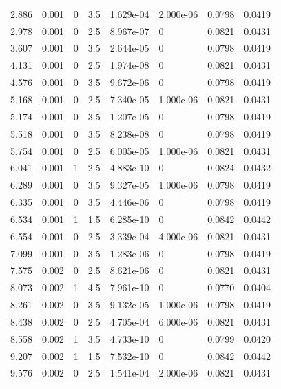 \documentclass[preview]{standalone}
\begin{document}
{{\begin{tabular}{L{1.2cm}C{1.2cm} C{0.3cm}C{0.5cm} C{1.4cm}C{1.4cm} C{1.4cm}C{1.4cm}}
  2.886  &  0.001  & 0     & 3.5 &  1.629e-04  & 2.000e-06  & 0.0798 &  0.0419   \\ 
  2.978  &  0.001  & 0     & 2.5 &  8.967e-07  & 0  & 0.0821 &  0.0431   \\ 
  3.607  &  0.001  & 0     & 3.5 &  2.644e-05  & 0  & 0.0798 &  0.0419   \\ 
  4.131  &  0.001  & 0     & 2.5 &  1.974e-08  & 0  & 0.0821 &  0.0431   \\ 
  4.576  &  0.001  & 0     & 3.5 &  9.672e-06  & 0  & 0.0798 &  0.0419   \\ 
  5.168  &  0.001  & 0     & 2.5 &  7.340e-05  & 1.000e-06  & 0.0821 &  0.0431   \\ 
  5.174  &  0.001  & 0     & 3.5 &  1.207e-05  & 0  & 0.0798 &  0.0419   \\ 
  5.518  &  0.001  & 0     & 3.5 &  8.238e-08  & 0  & 0.0798 &  0.0419   \\ 
  5.754  &  0.001  & 0     & 2.5 &  6.005e-05  & 1.000e-06  & 0.0821 &  0.0431   \\ 
  6.041  &  0.001  & 1     & 2.5 &  4.883e-10  & 0  & 0.0824 &  0.0432   \\ 
  6.289  &  0.001  & 0     & 3.5 &  9.327e-05  & 1.000e-06  & 0.0798 &  0.0419   \\ 
  6.335  &  0.001  & 0     & 3.5 &  4.446e-06  & 0  & 0.0798 &  0.0419   \\ 
  6.534  &  0.001  & 1     & 1.5 &  6.285e-10  & 0  & 0.0842 &  0.0442   \\ 
  6.554  &  0.001  & 0     & 2.5 &  3.339e-04  & 4.000e-06  & 0.0821 &  0.0431   \\ 
  7.099  &  0.001  & 0     & 3.5 &  1.283e-06  & 0  & 0.0798 &  0.0419   \\ 
  7.575  &  0.002  & 0     & 2.5 &  8.621e-06  & 0  & 0.0821 &  0.0431   \\ 
  8.073  &  0.002  & 1     & 4.5 &  7.961e-10  & 0  & 0.0770 &  0.0404   \\ 
  8.261  &  0.002  & 0     & 3.5 &  9.132e-05  & 1.000e-06  & 0.0798 &  0.0419   \\ 
  8.438  &  0.002  & 0     & 2.5 &  4.705e-04  & 6.000e-06  & 0.0821 &  0.0431   \\ 
  8.558  &  0.002  & 1     & 3.5 &  4.733e-10  & 0  & 0.0799 &  0.0420   \\ 
  9.207  &  0.002  & 1     & 1.5 &  7.532e-10  & 0  & 0.0842 &  0.0442   \\ 
  9.576  &  0.002  & 0     & 2.5 &  1.541e-04  & 2.000e-06  & 0.0821 &  0.0431   \\ 

\end{tabular}}}
\end{document}
